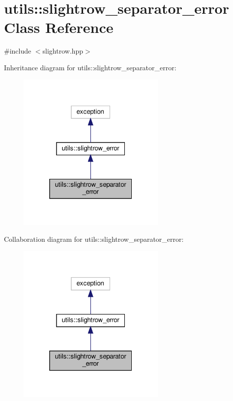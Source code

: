 \hypertarget{classutils_1_1slightrow__separator__error}{}\section{utils\+:\+:slightrow\+\_\+separator\+\_\+error Class Reference}
\label{classutils_1_1slightrow__separator__error}


{\ttfamily \#include $<$slightrow.\+hpp$>$}



Inheritance diagram for utils\+:\+:slightrow\+\_\+separator\+\_\+error\+:\nopagebreak
\begin{figure}[H]
\begin{center}
\leavevmode
\includegraphics[width=205pt]{classutils_1_1slightrow__separator__error__inherit__graph}
\end{center}
\end{figure}


Collaboration diagram for utils\+:\+:slightrow\+\_\+separator\+\_\+error\+:\nopagebreak
\begin{figure}[H]
\begin{center}
\leavevmode
\includegraphics[width=205pt]{classutils_1_1slightrow__separator__error__coll__graph}
\end{center}
\end{figure}


